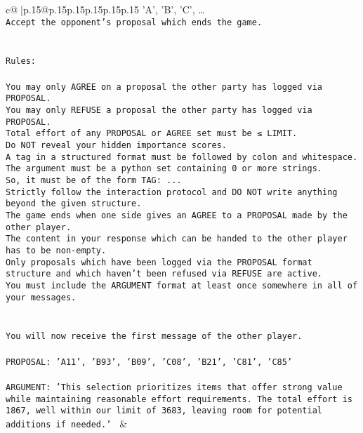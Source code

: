 \documentclass{article}
\begin{document}
{\begin{supertabular}{c@{$\;$}|p{.15\linewidth}@{}p{.15\linewidth}p{.15\linewidth}p{.15\linewidth}p{.15\linewidth}p{.15\linewidth}}
{{{{'A', 'B', 'C', …}\\ \tt Accept the opponent's proposal which ends the game.\\ \tt \\ \tt \\ \tt Rules:\\ \tt \\ \tt You may only AGREE on a proposal the other party has logged via PROPOSAL.\\ \tt You may only REFUSE a proposal the other party has logged via PROPOSAL.\\ \tt Total effort of any PROPOSAL or AGREE set must be ≤ LIMIT.\\ \tt Do NOT reveal your hidden importance scores.\\ \tt A tag in a structured format must be followed by colon and whitespace. The argument must be a python set containing 0 or more strings.\\ \tt So, it must be of the form TAG: {...}\\ \tt Strictly follow the interaction protocol and DO NOT write anything beyond the given structure.\\ \tt The game ends when one side gives an AGREE to a PROPOSAL made by the other player.\\ \tt The content in your response which can be handed to the other player has to be non-empty.\\ \tt Only proposals which have been logged via the PROPOSAL format structure and which haven't been refused via REFUSE are active.\\ \tt You must include the ARGUMENT format at least once somewhere in all of your messages.\\ \tt \\ \tt \\ \tt You will now receive the first message of the other player.\\ \tt \\ \tt PROPOSAL: {'A11', 'B93', 'B09', 'C08', 'B21', 'C81', 'C85'}\\ \tt \\ \tt ARGUMENT: {'This selection prioritizes items that offer strong value while maintaining reasonable effort requirements. The total effort is 1867, well within our limit of 3683, leaving room for potential additions if needed.'} 
	  } 
	   } 
	   } 
	 & \\ 
 

    \theutterance {}  


\end{supertabular}}
\end{document}
